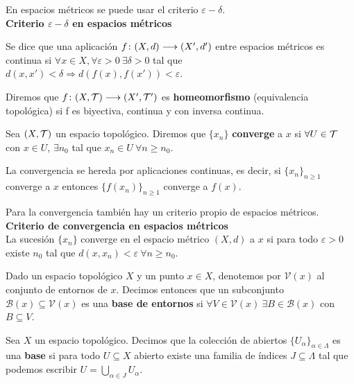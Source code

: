 \documentclass[GTS.tex]{subfiles}
\begin{document}
\vspace{0.5cm}

En espacios métricos se puede usar el criterio $\varepsilon-\delta$.\\
{\large \bf Criterio $\varepsilon-\delta$ en espacios métricos}

Se dice que una aplicación $f\colon{(X,d)}\longrightarrow{(X',d')}$ entre espacios métricos es continua si $\forall x\in X, \forall\varepsilon>0\ \exists\delta>0$ tal que $d(x,x')<\delta\Rightarrow d(f(x),f(x'))<\varepsilon$.

\vspace{0.5cm}

\begin{defi}Diremos que $f\colon{(X,\mathcal{T})}\longrightarrow{(X',\mathcal{T}')}$ es \textbf{homeomorfismo} (equivalencia topológica) si f es biyectiva, continua y con inversa continua.
\end{defi}

\begin{defi} Sea $(X,\mathcal{T})$ un espacio topológico. Diremos que $\{x_n\}$ \textbf{converge} a $x$ si $\forall U\in\mathcal{T}$ con $x\in U$, $\exists n_0$ tal que $x_n\in U\ \forall n\geq n_0$.
\end{defi}

La convergencia se hereda por aplicaciones continuas, es decir, si $\{x_n\}_{n\geq 1}$ converge a $x$ entonces $\{f(x_n)\}_{n\geq 1}$ converge a $f(x)$.

Para la convergencia también hay un criterio propio de espacios métricos.\\
{\large \bf Criterio de convergencia en espacios métricos}\\
La sucesión $\{x_n\}$ converge en el espacio métrico $(X,d)$ a $x$ si para todo $\varepsilon>0$ existe $n_0$ tal que $d(x,x_n)<\varepsilon\ \forall n\geq n_0$.

\begin{defi}
Dado un espacio topológico $X$ y un punto $x\in X$, denotemos por $\mathcal{V}(x)$ al conjunto de entornos de $x$. Decimos entonces que un subconjunto $\mathcal{B}(x)\subseteq\mathcal{V}(x)$ es una \textbf{base de entornos} si $\forall V\in\mathcal{V}(x)\ \exists B\in\mathcal{B}(x)$ con $B\subseteq V$. 
\end{defi}

\begin{defi} Sea $X$ un espacio topológico. Decimos que la colección de abiertos $\{U_\alpha\}_{\alpha\in\Lambda}$ es una \textbf{base} si para todo $U\subseteq X$ abierto existe una familia de índices $J\subseteq\Lambda$ tal que podemos escribir $U=\bigcup_{\alpha\in J}U_\alpha$.
\end{defi}
\end{document}
